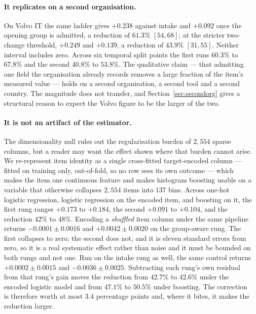 \documentclass[preprint,12pt]{elsarticle}
\begin{document}
\paragraph{It replicates on a second organisation.}
On Volvo IT the same ladder gives $+0.238$ against intake and $+0.092$ once
the opening group is admitted, a reduction of $61.3\%$ $[54,68]$; at the
stricter two-change threshold, $+0.249$ and $+0.139$, a reduction of $43.9\%$
$[31,55]$. Neither interval includes zero. Across six temporal split points
the first runs $60.3\%$ to $67.8\%$ and the second $40.8\%$ to $53.8\%$. The
qualitative claim --- that admitting one field the organisation already
records removes a large fraction of the item's measured value --- holds on a
second organisation, a second tool and a second country. The magnitude does
not transfer, and Section~\ref{sec:secondorg} gives a structural reason to
expect the Volvo figure to be the larger of the two.


\paragraph{It is not an artifact of the estimator.}
The dimensionality null rules out the regularisation burden of $2{,}554$
sparse columns, but a reader may want the effect shown where that burden
cannot arise. We re-represent item identity as a single cross-fitted
target-encoded column --- fitted on training only, out-of-fold, so no row
sees its own outcome --- which makes the item one continuous feature and
makes histogram boosting usable on a variable that otherwise collapses
$2{,}554$ items into $137$ bins. Across one-hot logistic regression,
logistic regression on the encoded item, and boosting on it, the first rung
ranges $+0.173$ to $+0.184$, the second $+0.091$ to $+0.104$, and the
reduction $42\%$ to $48\%$. Encoding a
\emph{shuffled} item column under the same pipeline returns
$-0.0001 \pm 0.0016$ and $+0.0042 \pm 0.0020$ on the group-aware rung. The
first collapses to zero; the second does not, and it is eleven standard
errors from zero, so it is a real systematic effect rather than noise and it
must be bounded on both rungs and not one. Run on the intake rung as well,
the same control returns $+0.0002 \pm 0.0015$ and $-0.0036 \pm 0.0025$.
Subtracting each rung's own residual from that rung's gain moves the
reduction from $42.7\%$ to $42.6\%$ under the encoded logistic model and from
$47.1\%$ to $50.5\%$ under boosting. The correction is therefore worth at
most $3.4$ percentage points and, where it bites, it makes the reduction
larger.
\end{document}
